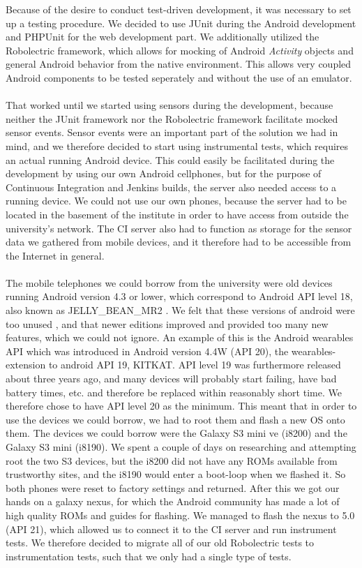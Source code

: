 Because of the desire to conduct test-driven development, it was necessary to set up a testing procedure. We decided to use JUnit during the Android development and PHPUnit for the web development part. We additionally utilized the Robolectric framework, which allows for mocking of Android \emph{Activity} objects and general Android behavior from the native environment. This allows very coupled Android components to be tested seperately and without the use of an emulator. 
\\\\
That worked until we started using sensors during the development, because neither the JUnit framework nor the Robolectric framework facilitate mocked sensor events. Sensor events were an important part of the solution we had in mind, and we therefore decided to start using instrumental tests, which requires an actual running Android device. This could easily be facilitated during the development by using our own Android cellphones, but for the purpose of Continuous Integration and Jenkins builds, the server also needed access to a running device. We could not use our own phones, because the server had to be located in the basement of the institute in order to have access from outside the university's network. The CI server also had to function as storage for the sensor data we gathered from mobile devices, and it therefore had to be accessible from the Internet in general.
\\\\
The mobile telephones we could borrow from the university were old devices running Android version 4.3 or lower, which correspond to Android API level 18, also known as JELLY_BEAN_MR2 \parencite{uses_sdk}. We felt that these versions of android were too unused \parencite{android_dashboard}, and that newer editions improved and provided too many new features, which we could not ignore. An example of this is the Android wearables API which was introduced in Android version 4.4W (API 20), the wearables-extension to android API 19, KITKAT. API level 19 was furthermore released about three years ago, and many devices will probably start failing, have bad battery times, etc. and therefore be replaced within reasonably short time. We therefore chose to have API level 20 as the minimum. This meant that in order to use the devices we could borrow, we had to root them and flash a new OS onto them. The devices we could borrow were the Galaxy S3 mini ve (i8200) and the Galaxy S3 mini (i8190). We spent a couple of days on researching and attempting root the two S3 devices, but the i8200 did not have any ROMs available from trustworthy sites, and the i8190 would enter a boot-loop when we flashed it. So both phones were reset to factory settings and returned. After this we got our hands on a galaxy nexus, for which the Android community has made a lot of high quality ROMs and guides for flashing. We managed to flash the nexus to 5.0 (API 21), which allowed us to connect it to the CI server and run instrument tests. We therefore decided to migrate all of our old Robolectric tests to instrumentation tests, such that we only had a single type of tests. 